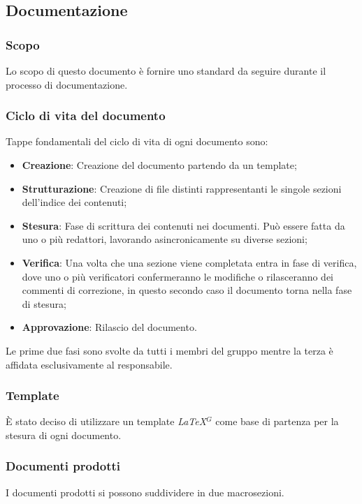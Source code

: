\nonstopmode
\subsection{Documentazione}

\subsubsection{Scopo}
Lo scopo di questo documento è fornire uno standard da seguire durante il processo di documentazione.

\subsubsection{Ciclo di vita del documento}
Tappe fondamentali del ciclo di vita di ogni documento sono:

\begin{itemize}
\item \textbf{Creazione}: Creazione del documento partendo da un template;
\item \textbf{Strutturazione}: Creazione di file distinti rappresentanti le singole sezioni dell'indice dei contenuti;
\item \textbf{Stesura}: Fase di scrittura dei contenuti nei documenti. Può essere fatta da uno o più redattori, lavorando asincronicamente su diverse sezioni;
\item \textbf{Verifica}: Una volta che una sezione viene completata entra in fase di verifica, dove uno o più verificatori confermeranno le modifiche o rilasceranno dei commenti di correzione, in questo secondo caso il documento torna nella fase di stesura;
\item \textbf{Approvazione}: Rilascio del documento.
\end{itemize}
  Le prime due fasi sono svolte da tutti i membri del gruppo mentre la terza è affidata esclusivamente al responsabile.

\subsubsection{Template}
È stato deciso di utilizzare un template \emph{\LaTeX}$^{G}$ come base di partenza per la stesura di ogni documento.

\subsubsection{Documenti prodotti}
I documenti prodotti si possono suddividere in due macrosezioni.


